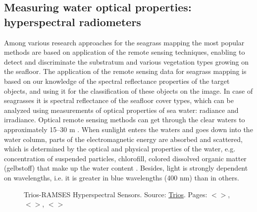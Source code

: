 \documentclass[11pt]{article}
\begin{document}
\subsection[Measuring water optical properties]{Measuring water optical properties: \\hyperspectral radiometers}\label{sec:2-2}\label{page-12}
Among various research approaches for the seagrass mapping the most popular methods are based on application of the remote sensing techniques,
 enabling to detect and discriminate the substratum and various vegetation types growing on the seafloor.
The application of the remote sensing data for seagrass mapping is based on our knowledge of the
spectral reflectance properties of the target objects, and using it for the classification of these objects
on the image. In case of seagrasses it is spectral reflectance of the seafloor cover types, which can be
analyzed using measurements of optical properties of sea water: radiance and irradiance.
Optical remote sensing methods can get through the clear waters to approximately 15–30 m \cite{Mumby04}\label{Mumby04}.
When sunlight enters the waters and goes down into the water column, parts of the
electromagnetic energy are absorbed and scattered, which is determined by the optical and physical
properties of the water, e.g. concentration of suspended particles, chlorofill, colored dissolved
organic matter (gelbstoff) that make up the water content \cite{Ackleson2003}\label{Ackleson, 2003}. Besides, light is strongly
dependent on wavelengths, i.e. it is greater in blue wavelengths (400 nm) than in others.

\begin{figure}[H]
	\centering
	\caption{\ac{Trios-RAMSES} Hyperspectral Sensors. Source: \href{http://www.trios.de}{Trios}. Pages: $<$\pageref{page-12}$>$, $<$\pageref{page-13}$>$, $<$\pageref{page-17}$>$}
	\label{fig:2.1}
\end{figure}
\end{document}
